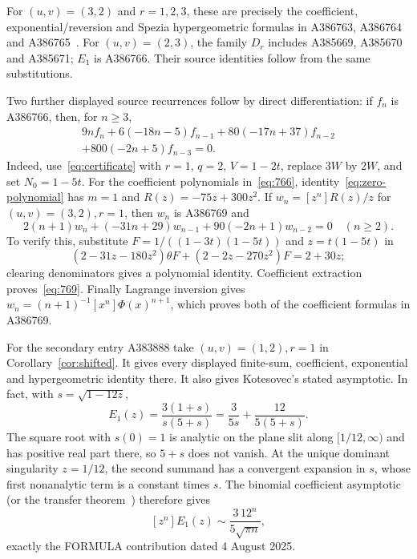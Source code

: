 \documentclass[11pt]{article}
\begin{document}
For $(u,v)=(3,2)$ and $r=1,2,3$, these are precisely the coefficient,
exponential/reversion and Spezia hypergeometric formulas in A386763,
A386764 and A386765~\cite{oeis763,secondary}. For $(u,v)=(2,3)$,
the family $D_r$ includes A385669, A385670 and A385671; $E_1$ is A386766.
Their source identities follow from the same substitutions.

Two further displayed source recurrences follow by direct differentiation:
if $f_n$ is A386766, then, for $n\geq3$,
\begin{multline}\label{eq:766}
9nf_n+6(-18n-5)f_{n-1}+80(-17n+37)f_{n-2}\\
 +800(-2n+5)f_{n-3}=0.
\end{multline}
Indeed, use~\eqref{eq:certificate} with $r=1$, $q=2$, $V=1-2t$,
replace $3W$ by $2W$, and set $N_0=1-5t$. For the coefficient
polynomials in~\eqref{eq:766}, identity~\eqref{eq:zero-polynomial}
has $m=1$ and $R(z)=-75z+300z^2$.
If $w_n=[z^n]R(z)/z$ for $(u,v)=(3,2),r=1$, then $w_n$ is A386769 and
\begin{equation}\label{eq:769}
 2(n+1)w_n+(-31n+29)w_{n-1}+90(-2n+1)w_{n-2}=0\quad(n\geq2).
\end{equation}
To verify this, substitute $F=1/((1-3t)(1-5t))$ and $z=t(1-5t)$ in
\[
 (2-31z-180z^2)\theta F+(2-2z-270z^2)F=2+30z;
\]
clearing denominators gives a polynomial identity. Coefficient
extraction proves~\eqref{eq:769}. Finally Lagrange inversion gives
$w_n=(n+1)^{-1}[x^n]\Phi(x)^{n+1}$, which proves both of the
coefficient formulas in A386769.

For the secondary entry A383888 take $(u,v)=(1,2),r=1$ in
Corollary~\ref{cor:shifted}. It gives every displayed finite-sum,
coefficient, exponential and hypergeometric identity there. It also
gives Kotesovec's stated asymptotic. In fact, with $s=\sqrt{1-12z}$,
\[
 E_1(z)=\frac{3(1+s)}{s(5+s)}
       =\frac{3}{5s}+\frac{12}{5(5+s)}.
\]
The square root with $s(0)=1$ is analytic on the plane slit along
$[1/12,\infty)$ and has positive real part there, so $5+s$ does not vanish.
At the unique dominant singularity $z=1/12$, the second summand has
a convergent expansion in $s$, whose first nonanalytic term is a
constant times $s$. The binomial coefficient asymptotic (or the
transfer theorem~\cite[Theorems VI.1 and VI.3]{flajolet}) therefore gives
\[
 [z^n]E_1(z)\sim\frac{3\,12^n}{5\sqrt{\pi n}},
\]
exactly the FORMULA contribution dated 4 August 2025.
\end{document}

